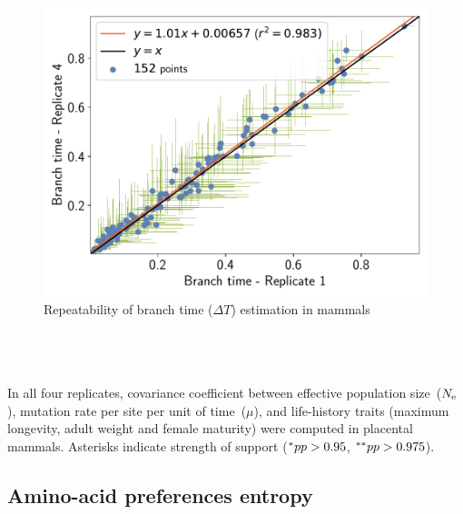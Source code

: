 \documentclass{article}
\begin{document}
\begin{figure}[H]
\begin{minipage}{0.32\linewidth}
			\includegraphics[width=\linewidth, page=1]{mammals/18CDS_SiteMutSelBranchNe_Rep_BranchTime-1-4}
		\end{minipage}
		\caption[Repeatability of branch time estimation in mammals]{Repeatability of branch time ($\Delta T$) estimation in mammals}
	\end{figure}

	\begin{table}[H]
		 \\
		 \\
		 \\
		
		\caption[Covariance matrix repeatability in mammals]{
		In all four replicates, covariance coefficient between effective population size~($N_{\text{e}}$), mutation rate per site per unit of time~($\mu$), and life-history traits (maximum longevity, adult weight and female maturity) were computed in placental mammals.
		Asterisks indicate strength of support ($\smash{^{*}} pp > 0.95$, $\smash{^{**}} pp > 0.975$).}
	\end{table}

	\subsection{Amino-acid preferences entropy}
\end{document}
